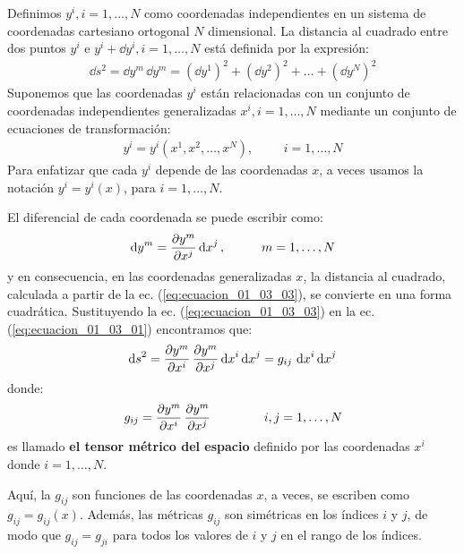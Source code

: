 \documentclass[hidelinks,12pt]{article}
\begin{document}
Definimos $y^{i}, i = 1, \ldots, N$ como coordenadas independientes en un sistema de coordenadas cartesiano ortogonal $N$ dimensional. La distancia al cuadrado entre dos puntos $y^{i}$ e $y^{i} + \dd{y}^{i}, i = 1, \ldots, N$ está definida por la expresión:
\begin{align}
\dd{s}^{2} = \dd{y}^{m} \, \dd{y}^{m} = (\dd{y}^{1})^{2} + (\dd{y}^{2})^{2} + \ldots + (\dd{y}^{N})^{2}
\label{eq:ecuacion_01_03_01}
\end{align}
Suponemos que las coordenadas $y^{i}$ están relacionadas con un conjunto de coordenadas independientes generalizadas $x^{i}, i = 1, \ldots, N$ mediante un conjunto de ecuaciones de transformación:
\begin{align}
y^{i} = y^{i} (x^{1}, x^{2}, \ldots, x^{N}), \hspace{1cm} i = 1, \ldots, N
\label{eq:ecuacion_01_03_02}
\end{align}
Para enfatizar que cada $y^{i}$ depende de las coordenadas $x$, a veces usamos la notación $y^{i} = y^{i} (x)$, para $i = 1, \ldots, N$.
\par
El diferencial de cada coordenada se puede escribir como:
\begin{align}
\dd{y}^{m} = \pdv{y^{m}}{x^{j}} \dd{x}^{j}, \hspace{1cm} m = 1, \ldots, N
\label{eq:ecuacion_01_03_03}
\end{align}
y en consecuencia, en las coordenadas generalizadas $x$, la distancia al cuadrado, calculada a partir de la ec. (\ref{eq:ecuacion_01_03_03}), se convierte en una forma cuadrática. Sustituyendo la ec. (\ref{eq:ecuacion_01_03_03}) en la ec. (\ref{eq:ecuacion_01_03_01}) encontramos que:
\begin{align}
\dd{s}^{2} = \pdv{y^{m}}{x^{i}} \, \pdv{y^{m}}{x^{j}} \dd{x}^{i} \dd{x}^{j} = g_{ij} \, \dd{x}^{i} \dd{x}^{j}
\label{eq:ecuacion_01_03_04}
\end{align}
donde:
\begin{align}
g_{ij} = \pdv{y^{m}}{x^{i}} \, \pdv{y^{m}}{x^{j}} \hspace{1.5cm} i, j = 1, \ldots, N
\label{eq:ecuacion_01_03_05}
\end{align}
es llamado \textbf{el tensor métrico del espacio} definido por las coordenadas $x^{i}$ donde $i = 1, \ldots, N$.
\par
Aquí, la $g_{ij}$ son funciones de las coordenadas $x$, a veces, se escriben como $g_{ij} = g_{ij} (x)$. Además, las métricas $g_{ij}$ son simétricas en los índices $i$ y $j$, de modo que $g_{ij} = g_{ji}$ para todos los valores de $i$ y $j$ en el rango de los índices.
\end{document}
